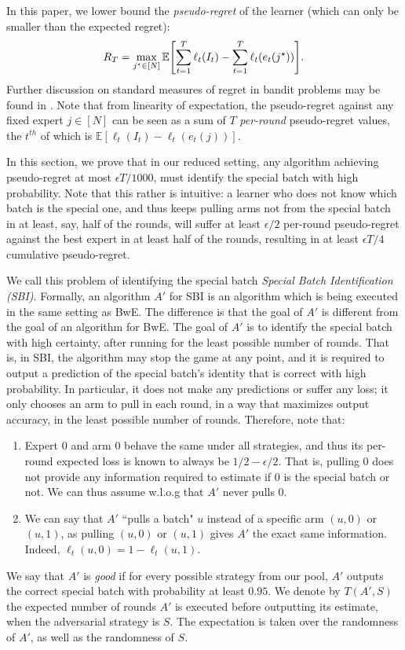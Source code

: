 \documentclass[a4paper,11pt]{article}
\theoremstyle{definition}
\begin{document}
In this paper, we lower bound the \emph{pseudo-regret} of the learner (which can only be smaller than the expected regret):
\[
    R_T = \max_{j^\star \in [N]} \mathbb{E} \mleft[ \sum_{t=1}^T \ell_t(I_t) - \sum_{t=1}^T \ell_t(e_t(j^\star)) \mright].
\]
Further discussion on standard measures of regret in bandit problems may be found in \cite{bubeck2012regret}.
Note that from linearity of expectation, the pseudo-regret against any fixed expert $j \in [N]$ can be seen as a sum of $T$ \emph{per-round} pseudo-regret values, the $t^{th}$ of which is $\mathbb{E}[\ell_t(I_t) - \ell_t(e_t(j))]$.

In this section, we prove that in our reduced setting, any algorithm achieving pseudo-regret at most $\epsilon T /1000$, must identify the special batch with high probability. Note that this rather is intuitive: a learner who does not know which batch is the special one, and thus keeps pulling arms not from the special batch in at least, say, half of the rounds, will suffer at least $\epsilon/2$ per-round pseudo-regret against the best expert in at least half of the rounds, resulting in at least $\epsilon T /4$ cumulative pseudo-regret. 

We call this problem of identifying the special batch \emph{Special Batch Identification (SBI)}.
Formally, an algorithm $A'$ for SBI is an algorithm which is being executed in the same setting as BwE. The difference is that the goal of $A'$ is different from the goal of an algorithm for BwE. The goal of $A'$ is to identify the special batch with high certainty, after running for the least possible number of rounds. That is, in SBI, the algorithm may stop the game at any point, and it is required to output a prediction of the special batch's identity that is correct with high probability. In particular, it does not make any predictions or suffer any loss; it only chooses an arm to pull in each round, in a way that maximizes output accuracy, in the least possible number of rounds. Therefore, note that:
\begin{enumerate}
    \item Expert $0$ and arm $0$ behave the same under all strategies, and thus its per-round expected loss is known to always be $1/2-\epsilon/2$. That is, pulling $0$ does not provide any information required to estimate if $0$ is the special batch or not. We can thus assume w.l.o.g that $A'$ never pulls $0$.
    \item We can say that $A'$ ``pulls a batch" $u$ instead of a specific arm $(u,0)$ or $(u,1)$, as pulling $(u,0)$ or $(u,1)$ gives $A'$ the exact same information. Indeed, $\ell_t(u,0) = 1- \ell_t(u,1)$.
\end{enumerate}
We say that $A'$ is \emph{good} if for every possible strategy from our pool, $A'$ outputs the correct special batch with probability at least $0.95$. We denote by $T(A',S)$ the expected number of rounds $A'$ is executed before outputting its estimate, when the adversarial strategy is $S$. The expectation is taken over the randomness of $A'$, as well as the randomness of $S$.
\end{document}
